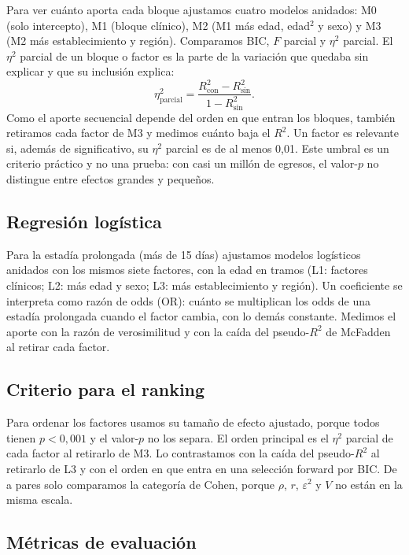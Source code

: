 \documentclass[10.5pt,a4paper,headings=small,abstract=false,bibliography=totoc,listof=totoc]{scrartcl}
\begin{document}
Para ver cuánto aporta cada bloque ajustamos cuatro modelos anidados: M0 (solo intercepto), M1 (bloque clínico), M2 (M1 más edad, edad$^2$ y sexo) y M3 (M2 más establecimiento y región). Comparamos BIC, $F$ parcial y $\eta^2$ parcial. El $\eta^2$ parcial de un bloque o factor es la parte de la variación que quedaba sin explicar y que su inclusión explica:
\[
\eta^2_{\text{parcial}}=\frac{R^2_{\text{con}}-R^2_{\text{sin}}}{1-R^2_{\text{sin}}}.
\]
Como el aporte secuencial depende del orden en que entran los bloques, también retiramos cada factor de M3 y medimos cuánto baja el $R^2$. Un factor es relevante si, además de significativo, su $\eta^2$ parcial es de al menos 0,01. Este umbral es un criterio práctico y no una prueba: con casi un millón de egresos, el valor-$p$ no distingue entre efectos grandes y pequeños.

\subsection{Regresión logística}

Para la estadía prolongada (más de 15 días) ajustamos modelos logísticos anidados con los mismos siete factores, con la edad en tramos (L1: factores clínicos; L2: más edad y sexo; L3: más establecimiento y región). Un coeficiente se interpreta como razón de odds (OR): cuánto se multiplican los odds de una estadía prolongada cuando el factor cambia, con lo demás constante. Medimos el aporte con la razón de verosimilitud y con la caída del pseudo-$R^2$ de McFadden al retirar cada factor.

\subsection{Criterio para el ranking}

Para ordenar los factores usamos su tamaño de efecto ajustado, porque todos tienen $p<0{,}001$ y el valor-$p$ no los separa. El orden principal es el $\eta^2$ parcial de cada factor al retirarlo de M3. Lo contrastamos con la caída del pseudo-$R^2$ al retirarlo de L3 y con el orden en que entra en una selección forward por BIC. De a pares solo comparamos la categoría de Cohen, porque $\rho$, $r$, $\varepsilon^2$ y $V$ no están en la misma escala.

\subsection{Métricas de evaluación}
\end{document}
